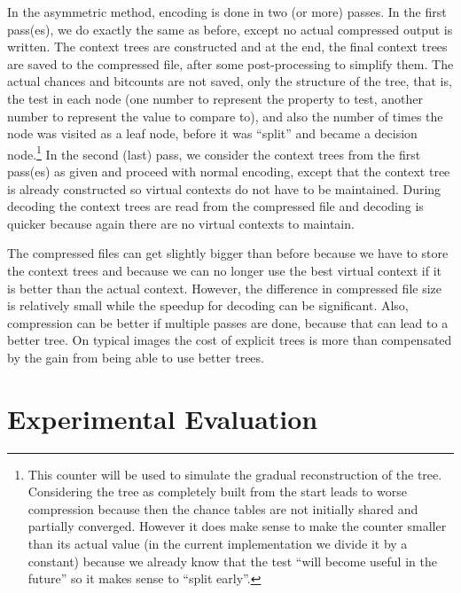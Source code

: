 \documentclass{article}
\begin{document}
{In the asymmetric method, encoding is done in two (or more) passes.
In the first pass(es), we do exactly the same as before, except no actual compressed output is written.
The context trees are constructed and at the end, the final context trees are saved to the compressed file,
after some post-processing to simplify them. The actual chances and bitcounts are not saved, only the structure of the tree,
that is, the test in each node (one number to represent the property to test, another number to represent the value to compare to),
and also the number of times the node was visited as a leaf node, before it was ``split'' and became a decision node.\footnote{
This counter will be used to simulate the gradual reconstruction of the tree. Considering the tree as completely built from the start
leads to worse compression because then the chance tables are not initially shared and partially converged. However it does make sense
to make the counter smaller than its actual value (in the current implementation we divide it by a constant) because we already know
that the test ``will become useful in the future'' so it makes sense to ``split early''.}
In the second (last) pass, we consider the context trees
from the first pass(es) as given and proceed with normal encoding,
except that the context tree is already constructed so virtual contexts do not have to be maintained.
During decoding the context trees are read from the compressed file and decoding is quicker
because again there are no virtual contexts to maintain.

The compressed files can get slightly bigger than before
because we have to store the context trees and because we can no longer
use the best virtual context if it is better than the actual context.
However, the difference in compressed file size is relatively small while the
speedup for decoding can be significant.
Also, compression can be better if multiple passes are done, because that can lead to a better tree.
On typical images the cost of explicit trees is more than compensated by the gain from being able to use better trees.
}



\section{Experimental Evaluation}
\label{sec:benchmarks}
\end{document}
